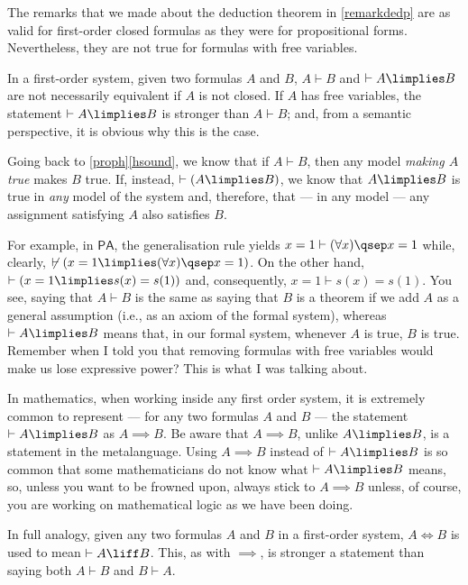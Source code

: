 \begin{para}
The remarks that we made about the deduction theorem in \ref{remarkdedp} are as valid for first-order closed formulas as they were for propositional forms. Nevertheless, they are not true for formulas with free variables.

In a first-order system, given two formulas $A$ and $B$, $A\vdash B$ and $\vdash A\limplies B$ are not necessarily equivalent if $A$ is not closed.
If $A$ has free variables, the statement $\vdash A \limplies B$ is stronger than $A \vdash B$; and, from a semantic perspective, it is obvious why this is the case.

Going back to \ref{proph}\ref{hsound}, we know that if $A\vdash B$, then any model \emph{making $A$ true} makes $B$ true.
If, instead, $\vdash (A\limplies B)$, we know that $A\limplies B$ is true in \emph{any} model of the system and, therefore, that --- in any model --- any assignment satisfying $A$ also satisfies $B$.

For example, in $\mathsf{PA}$, the generalisation rule yields $x = 1 \vdash (\forall x)\qsep x = 1$ while, clearly, $\not\vdash (x = 1 \limplies (\forall x)\qsep x = 1)$. On the other hand, $\vdash (x = 1 \limplies s(x)  = s(1))$ and, consequently, $x = 1 \vdash s(x) = s(1)$.
You see, saying that $A \vdash B$ is the same as saying that $B$ is a theorem if we add $A$ as a general assumption (i.e., as an axiom of the formal system), whereas $\vdash A \limplies B$ means that, in our formal system, whenever $A$ is true, $B$ is true.
Remember when I told you that removing formulas with free variables would make us lose expressive power? This is what I was talking about. 

In mathematics, when working inside any first order system, it is extremely common to represent --- for any two formulas $A$ and $B$ --- the statement $\vdash A\limplies B$ as $A\implies B$.
Be aware that $A\implies B$, unlike $A\limplies B$, is a statement in the metalanguage.
Using $A\implies B$ instead of $\vdash A\limplies B$ is so common that some mathematicians do not know what $\vdash A \limplies B$ means, so, unless you want to be frowned upon, always stick to $A\implies B$ unless, of course, you are working on mathematical logic as we have been doing.

In full analogy, given any two formulas $A$ and $B$ in a first-order system, $A\iff B$ is used to mean $\vdash A\liff B$. This, as with $\implies$, is stronger a statement than saying both $A\vdash B$ and $B\vdash A$.
\end{para}

